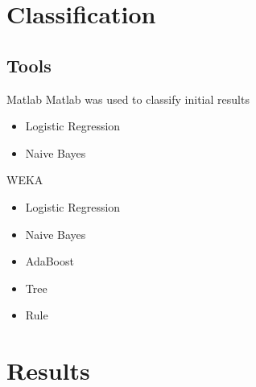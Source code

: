\section{Classification}
\subsection{Tools}
\begin{frame}{ }
    \begin{block}{Matlab} 
     Matlab was used to classify initial results
	\begin{itemize}
	    \item Logistic Regression 
	    \item Naive Bayes
	\end{itemize} 
    \end{block}
    \begin{block}{WEKA} \begin{itemize}
	\item Logistic Regression 
	\item Naive Bayes
	\item AdaBoost
	\item Tree
	\item Rule
    \end{itemize} \end{block}
\end{frame}

\section{Results}

